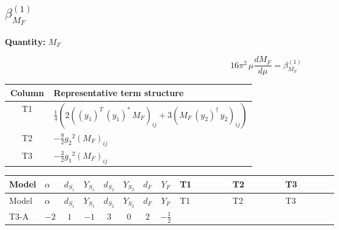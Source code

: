 \documentclass[8pt]{article}
\begin{document}
\begin{landscape}
\section*{$\beta_{M_F}^{(1)}$}
\noindent\textbf{Quantity: }$M_F$\par\smallskip
\[16\pi^2\,\mu\frac{d M_F}{d\mu}=\beta_{M_F}^{(1)}\]
\begin{center}
\begin{tabular}{@{}c >{\raggedright\arraybackslash}p{0.82\linewidth}@{}}
\toprule
Column & Representative term structure \\
\midrule
T1 & \(\displaystyle \frac{1}{4} (2 \left(\left({y_1}\right)^{T}\,\left({y_1}\right)^{*}\,{M_F}\right)_{ij}+3 \left({M_F}\,\left({y_2}\right)^{\dagger}\,{y_2}\right)_{ij})\) \\
\midrule
T2 & \(\displaystyle -\frac{9}{2} {g_2}^2 \left({M_F}\right)_{ij}\) \\
\midrule
T3 & \(\displaystyle -\frac{3}{2} {g_1}^2 \left({M_F}\right)_{ij}\) \\
\midrule
\bottomrule
\end{tabular}
\end{center}
\smallskip
\tiny
\begin{longtable}{@{}llcccccc >{\raggedright\arraybackslash}p{0.21\linewidth} >{\raggedright\arraybackslash}p{0.21\linewidth} >{\raggedright\arraybackslash}p{0.21\linewidth}@{}}
\toprule
Model & $\alpha$ & $d_{S_1}$ & $Y_{S_1}$ & $d_{S_2}$ & $Y_{S_2}$ & $d_F$ & $Y_F$ & T1 & T2 & T3 \\
\midrule
\endfirsthead
\toprule
Model & $\alpha$ & $d_{S_1}$ & $Y_{S_1}$ & $d_{S_2}$ & $Y_{S_2}$ & $d_F$ & $Y_F$ & T1 & T2 & T3 \\
\midrule
\endhead
T3-A & $-2$ & $1$ & $-1$ & $3$ & $0$ & $2$ & $-\frac{1}{2}$ & \scriptsize\adjustbox{max width=\linewidth}{$\begin{gathered} \frac{1}{4} (2 \left(\left({y_1}\right)^{T}\,\left({y_1}\right)^{*}\,{M_F}\right)_{ij}+3 \left({M_F}\,\left({y_2}\right)^{\dagger}\,{y_2}\right)_{ij})\end{gathered}$} & \scriptsize\adjustbox{max width=\linewidth}{$\begin{gathered} -\frac{9}{2} {g_2}^2 \left({M_F}\right)_{ij}\end{gathered}$} & \scriptsize\adjustbox{max width=\linewidth}{$\begin{gathered} -\frac{3}{2} {g_1}^2 \left({M_F}\right)_{ij}\end{gathered}$} \\
\midrule
\bottomrule
\end{longtable}
\clearpage

\end{landscape}
\end{document}
